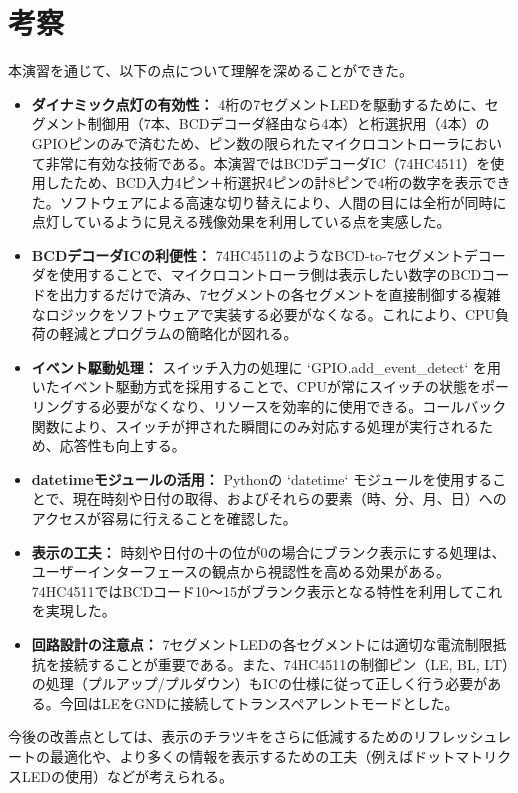 \documentclass[a4paper,11pt,dvipdfmx]{jsarticle}
\begin{document}
\section{考察}
本演習を通じて、以下の点について理解を深めることができた。
\begin{itemize}
    \item \textbf{ダイナミック点灯の有効性：} 4桁の7セグメントLEDを駆動するために、セグメント制御用（7本、BCDデコーダ経由なら4本）と桁選択用（4本）のGPIOピンのみで済むため、ピン数の限られたマイクロコントローラにおいて非常に有効な技術である。本演習ではBCDデコーダIC（74HC4511）を使用したため、BCD入力4ピン＋桁選択4ピンの計8ピンで4桁の数字を表示できた。ソフトウェアによる高速な切り替えにより、人間の目には全桁が同時に点灯しているように見える残像効果を利用している点を実感した。
    \item \textbf{BCDデコーダICの利便性：} 74HC4511のようなBCD-to-7セグメントデコーダを使用することで、マイクロコントローラ側は表示したい数字のBCDコードを出力するだけで済み、7セグメントの各セグメントを直接制御する複雑なロジックをソフトウェアで実装する必要がなくなる。これにより、CPU負荷の軽減とプログラムの簡略化が図れる。
    \item \textbf{イベント駆動処理：} スイッチ入力の処理に `GPIO.add\_event\_detect` を用いたイベント駆動方式を採用することで、CPUが常にスイッチの状態をポーリングする必要がなくなり、リソースを効率的に使用できる。コールバック関数により、スイッチが押された瞬間にのみ対応する処理が実行されるため、応答性も向上する。
    \item \textbf{datetimeモジュールの活用：} Pythonの `datetime` モジュールを使用することで、現在時刻や日付の取得、およびそれらの要素（時、分、月、日）へのアクセスが容易に行えることを確認した。
    \item \textbf{表示の工夫：} 時刻や日付の十の位が0の場合にブランク表示にする処理は、ユーザーインターフェースの観点から視認性を高める効果がある。74HC4511ではBCDコード10〜15がブランク表示となる特性を利用してこれを実現した。
    \item \textbf{回路設計の注意点：} 7セグメントLEDの各セグメントには適切な電流制限抵抗を接続することが重要である。また、74HC4511の制御ピン（LE, BL, LT）の処理（プルアップ/プルダウン）もICの仕様に従って正しく行う必要がある。今回はLEをGNDに接続してトランスペアレントモードとした。
\end{itemize}
今後の改善点としては、表示のチラツキをさらに低減するためのリフレッシュレートの最適化や、より多くの情報を表示するための工夫（例えばドットマトリクスLEDの使用）などが考えられる。
\end{document}

